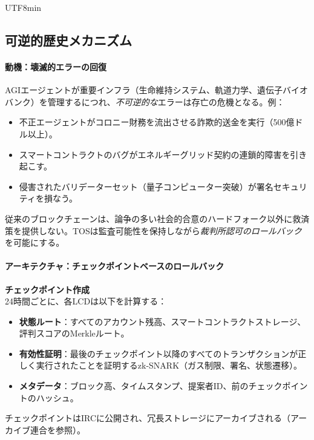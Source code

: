 \documentclass[11pt]{article}
\begin{document}
\begin{CJK}{UTF8}{min}
\subsection{可逆的歴史メカニズム}

\paragraph{動機：壊滅的エラーの回復}
AGIエージェントが重要インフラ（生命維持システム、軌道力学、遺伝子バイオバンク）を管理するにつれ、\emph{不可逆的な}エラーは存亡の危機となる。例：
\begin{itemize}[noitemsep]
  \item 不正エージェントがコロニー財務を流出させる詐欺的送金を実行（500億ドル以上）。
  \item スマートコントラクトのバグがエネルギーグリッド契約の連鎖的障害を引き起こす。
  \item 侵害されたバリデーターセット（量子コンピューター突破）が署名セキュリティを損なう。
\end{itemize}
従来のブロックチェーンは、論争の多い社会的合意のハードフォーク以外に救済策を提供しない。TOSは監査可能性を保持しながら\emph{裁判所認可のロールバック}を可能にする。

\paragraph{アーキテクチャ：チェックポイントベースのロールバック}
\textbf{チェックポイント作成}\\
24時間ごとに、各LCDは以下を計算する：
\begin{itemize}[noitemsep]
  \item \textbf{状態ルート}：すべてのアカウント残高、スマートコントラクトストレージ、評判スコアのMerkleルート。
  \item \textbf{有効性証明}：最後のチェックポイント以降のすべてのトランザクションが正しく実行されたことを証明するzk-SNARK（ガス制限、署名、状態遷移）。
  \item \textbf{メタデータ}：ブロック高、タイムスタンプ、提案者ID、前のチェックポイントのハッシュ。
\end{itemize}
チェックポイントはIRCに公開され、冗長ストレージにアーカイブされる（アーカイブ連合を参照）。


\end{CJK}
\end{document}
